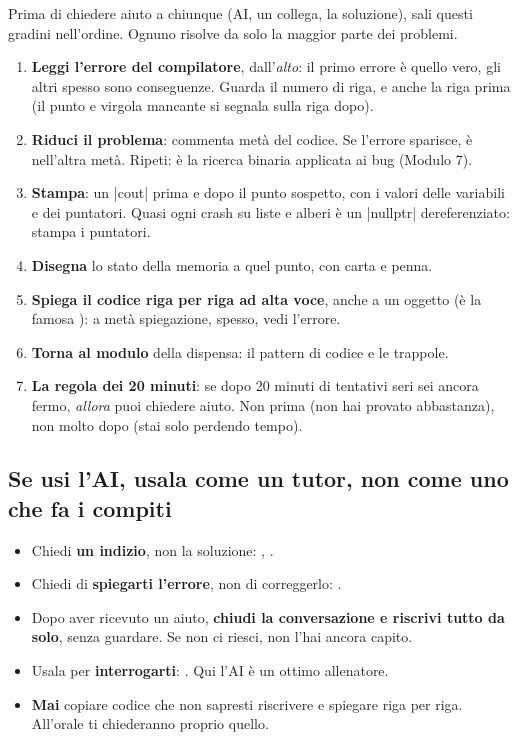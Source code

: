 Prima di chiedere aiuto a chiunque (AI, un collega, la soluzione), sali questi gradini
nell'ordine. Ognuno risolve da solo la maggior parte dei problemi.
\begin{passopasso}
\begin{enumerate}
  \item \textbf{Leggi l'errore del compilatore}, dall'\emph{alto}: il primo errore è
        quello vero, gli altri spesso sono conseguenze. Guarda il numero di riga, e
        anche la riga prima (il punto e virgola mancante si segnala sulla riga dopo).
  \item \textbf{Riduci il problema}: commenta metà del codice. Se l'errore sparisce, è
        nell'altra metà. Ripeti: è la ricerca binaria applicata ai bug (Modulo 7).
  \item \textbf{Stampa}: un \cc|cout| prima e dopo il punto sospetto, con i valori delle
        variabili e dei puntatori. Quasi ogni crash su liste e alberi è un
        \cc|nullptr| dereferenziato: stampa i puntatori.
  \item \textbf{Disegna} lo stato della memoria a quel punto, con carta e penna.
  \item \textbf{Spiega il codice riga per riga ad alta voce}, anche a un oggetto (è la
        famosa ): a metà spiegazione, spesso, vedi
        l'errore.
  \item \textbf{Torna al modulo} della dispensa: il pattern di codice e le trappole.
  \item \textbf{La regola dei 20 minuti}: se dopo 20 minuti di tentativi seri sei ancora
        fermo, \emph{allora} puoi chiedere aiuto. Non prima (non hai provato abbastanza),
        non molto dopo (stai solo perdendo tempo).
\end{enumerate}
\end{passopasso}

\subsection*{Se usi l'AI, usala come un tutor, non come uno che fa i compiti}

\begin{itemize}
  \item Chiedi \textbf{un indizio}, non la soluzione: , .
  \item Chiedi di \textbf{spiegarti l'errore}, non di correggerlo: .
  \item Dopo aver ricevuto un aiuto, \textbf{chiudi la conversazione e riscrivi tutto da
        solo}, senza guardare. Se non ci riesci, non l'hai ancora capito.
  \item Usala per \textbf{interrogarti}: . Qui l'AI è un ottimo allenatore.
  \item \textbf{Mai} copiare codice che non sapresti riscrivere e spiegare riga per
        riga. All'orale ti chiederanno proprio quello.
\end{itemize}

